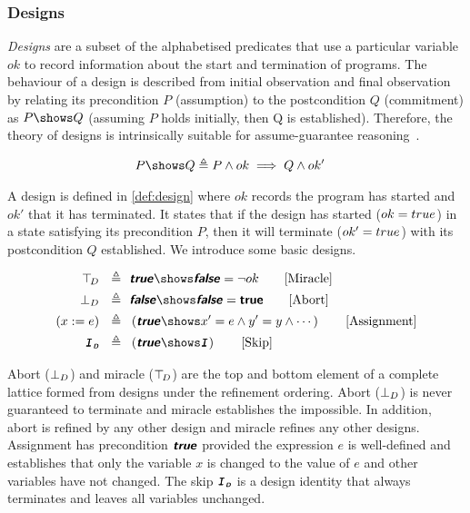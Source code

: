 \subsubsection{Designs}
\emph{Designs} are a subset of the alphabetised predicates that use a particular variable $ok$ to record information about the start and termination of programs. The behaviour of a design is described from initial observation and final observation by relating its precondition $P$ (assumption) to the postcondition $Q$ (commitment) as $\design{P}{Q}$ \cite{Woodcock2004, Hoare1998} (assuming $P$ holds initially, then Q is established). Therefore, the theory of designs is intrinsically suitable for assume-guarantee reasoning~\cite{Foster2017b}. 

\begin{definition}[Design] \label{def:design} 
  \begin{align*}
      & \design{P}{Q} \defs P \land ok \implies Q \land ok' & 
  \end{align*}
\end{definition}
A design is defined in \ref{def:design} where $ok$ records the program has started and $ok'$ that it has terminated. It states that if the design has started ($ok=\logtrue{}$) in a state satisfying its precondition $P$, then it will terminate ($ok'=\logtrue{}$) with its postcondition $Q$ established. We introduce some basic designs.

\begin{definition} \label{def:basic_des}
  \begin{align*}
      \topD ~~\defs~~& \design{\true}{\false} = \lnot ok \tag*{[Miracle]}\\
      \botD ~~\defs~~& \design{\false}{\false} = \trueD \tag*{[Abort]}\\
      (x := e) ~~\defs~~& \left(\design{\true}{x'=e\land y' = y \land \cdots}\right) \tag*{[Assignment]} \\ 
      \IID ~~\defs~~& \left(\design{\true}{\II}\right) \tag*{[Skip]}
  \end{align*}
\end{definition}

Abort ($\bot_D$) and miracle ($\top_{\!D}$) are the top and bottom element of a complete lattice formed from designs under the refinement ordering. Abort ($\bot_D$) is never guaranteed to terminate and miracle establishes the impossible. In addition, abort is refined by any other design and miracle refines any other designs. Assignment has precondition $\hbox{\textbf{\textsf{\textsl{true}}}}$ provided the expression $e$ is well-defined and establishes that only the variable $x$ is changed to the value of $e$ and other variables have not changed. The skip $\IID$ is a design identity that always terminates and leaves all variables unchanged.


